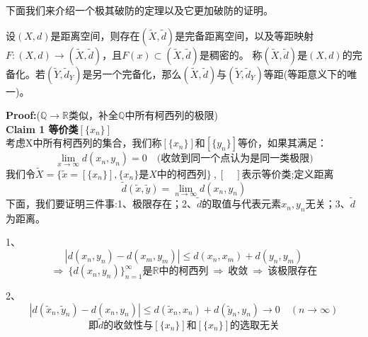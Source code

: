 下面我们来介绍一个极其破防的定理以及它更加破防的证明。
\begin{theorem}[完备化定理]
    设$(X,d)$是距离空间，则存在$(\tilde{X},\tilde{d})$是完备距离空间，以及等距映射$F:(X,d) \rightarrow (\tilde{X},\tilde{d})$，且$F(x) \subset (\tilde{X},\tilde{d})$是稠密的。
    称$(\tilde{X},\tilde{d})$是$(X,d)$的完备化。若$(\tilde{Y},\tilde{d}_Y)$是另一个完备化，那么$(\tilde{X},\tilde{d})$与$(\tilde{Y},\tilde{d}_Y)$等距(等距意义下的唯一)。
\end{theorem}
\textbf{Proof:}($\mathbb{Q} \to \mathbb{R}$类似，补全$\mathbb{Q}$中所有柯西列的极限)\\
\textbf{Claim 1 等价类$[\{x_n\}]$}\\
考虑X中所有柯西列的集合，我们称$[\{x_n\}]$和$[\{y_n\}]$等价，如果其满足：
\[\lim_{x \to \infty}d(x_n,y_n)=0 \quad \text{(收敛到同一个点认为是同一类极限)}\]
我们令$\tilde{X}=\{\tilde{x}=[\{x_n\}],\{x_n\}\text{是}X\text{中的柯西列}\} \ $,$ \ [ \quad ]$表示等价类;定义距离
\[\tilde{d}(\tilde{x},\tilde{y})=\lim_{n \to \infty}d(x_n,y_n)\]
下面，我们要证明三件事:1、极限存在；2、$\tilde{d}$的取值与代表元素$x_n,y_n$无关；3、$\tilde{d}$为距离。

1、
\[|d(x_n,y_n)-d(x_m,y_m)| \leq d(x_n,x_m)+d(y_n,y_m)\]
\[\Rightarrow \ \{d(x_n,y_n)\}_{n=1}^{\infty}\text{是}\mathbb{R}\text{中的柯西列} \ \Rightarrow \ \text{收敛} \ \Rightarrow \ \text{该极限存在}\]

2、
\[|d(\tilde{x}_n,\tilde{y}_n)-d(x_n,y_n)| \leq d(\tilde{x}_n,x_n)+d(\tilde{y}_n,y_n)\to 0 \quad (n \to \infty)\]
\[\text{即$\tilde{d}$的收敛性与$[\{x_n\}]$和$[\{x_n\}]$的选取无关}\]

